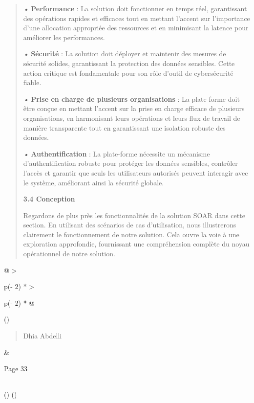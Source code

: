 \documentclass[
]{article}
\begin{document}
\begin{quote}
\emph{•} \textbf{Performance} : La solution doit fonctionner en temps
réel, garantissant des opérations rapides et efficaces tout en mettant
l'accent sur l'importance d'une allocation appropriée des ressources et
en minimisant la latence pour améliorer les performances.

\emph{•} \textbf{Sécurité} : La solution doit déployer et maintenir des
mesures de sécurité solides, garantissant la protection des données
sensibles. Cette action critique est fondamentale pour son rôle d'outil
de cybersécurité fiable.

\emph{•} \textbf{Prise en charge de plusieurs organisations} : La
plate-forme doit être conçue en mettant l'accent sur la prise en charge
efficace de plusieurs organisations, en harmonisant leurs opérations et
leurs flux de travail de manière transparente tout en garantissant une
isolation robuste des données.

\emph{•} \textbf{Authentification} : La plate-forme nécessite un
mécanisme d'authentification robuste pour protéger les données
sensibles, contrôler l'accès et garantir que seuls les utilisateurs
autorisés peuvent interagir avec le système, améliorant ainsi la
sécurité globale.

\textbf{3.4 Conception}

Regardons de plus près les fonctionnalités de la solution SOAR dans
cette section. En utilisant des scénarios de cas d'utilisation, nous
illustrerons clairement le fonctionnement de notre solution. Cela ouvre
la voie à une exploration approfondie, fournissant une compréhension
complète du noyau opérationnel de notre solution.
\end{quote}

\begin{longtable}[]{@{}
  >{\raggedright\arraybackslash}p{(\columnwidth - 2\tabcolsep) * }
  >{\raggedright\arraybackslash}p{(\columnwidth - 2\tabcolsep) * }@{}}
\toprule()
\begin{minipage}[b]{\linewidth}\raggedright
\begin{quote}
Dhia Abdelli
\end{quote}
\end{minipage} & \begin{minipage}[b]{\linewidth}\raggedright
Page 33
\end{minipage} \\
\midrule()
\endhead
\bottomrule()
\end{longtable}
\end{document}
